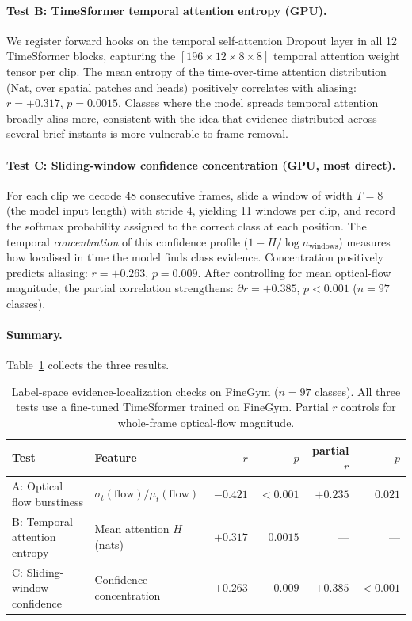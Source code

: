 \documentclass[runningheads]{llncs}
\newcommand{\tabtight}{\setlength{\tabcolsep}{3.5pt}\renewcommand{\arraystretch}{1.12}}
\begin{document}
\paragraph{Test B: TimeSformer temporal attention entropy (GPU).} We register forward hooks on the temporal self-attention Dropout layer in all 12 TimeSformer blocks, capturing the $[196\times12\times8\times8]$ temporal attention weight tensor per clip. The mean entropy of the time-over-time attention distribution (Nat, over spatial patches and heads) positively correlates with aliasing: $r=+0.317$, $p=0.0015$. Classes where the model spreads temporal attention broadly alias more, consistent with the idea that evidence distributed across several brief instants is more vulnerable to frame removal.

\paragraph{Test C: Sliding-window confidence concentration (GPU, most direct).} For each clip we decode 48 consecutive frames, slide a window of width $T=8$ (the model input length) with stride 4, yielding 11 windows per clip, and record the softmax probability assigned to the correct class at each position. The temporal \emph{concentration} of this confidence profile ($1 - H/\log n_\mathrm{windows}$) measures how localised in time the model finds class evidence. Concentration positively predicts aliasing: $r=+0.263$, $p=0.009$. After controlling for mean optical-flow magnitude, the partial correlation strengthens: $\partial r = +0.385$, $p<0.001$ ($n=97$ classes).

\paragraph{Summary.} Table~\ref{tab:label_space_nyquist} collects the three results.

\begin{table}[!htbp]
\centering
\caption{Label-space evidence-localization checks on FineGym ($n=97$ classes). All three tests use a fine-tuned TimeSformer trained on FineGym. Partial $r$ controls for whole-frame optical-flow magnitude.}
\label{tab:label_space_nyquist}
\scriptsize\tabtight
\begin{tabular}{l l r r r r}
\toprule
Test & Feature & $r$ & $p$ & partial $r$ & $p$ \\
\midrule
A: Optical flow burstiness & $\sigma_t(\text{flow}) / \mu_t(\text{flow})$ & $-0.421$ & ${<}0.001$ & $+0.235$ & $0.021$ \\
B: Temporal attention entropy & Mean attention $H$ (nats) & $+0.317$ & $0.0015$ & --- & --- \\
C: Sliding-window confidence & Confidence concentration & $+0.263$ & $0.009$ & $\mathbf{+0.385}$ & $\mathbf{<0.001}$ \\
\bottomrule
\end{tabular}
\end{table}
\end{document}
